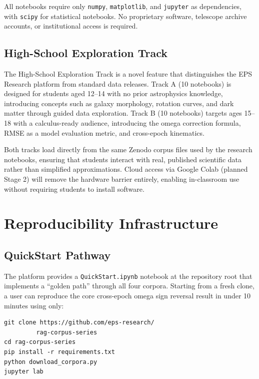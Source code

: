 \documentclass[twocolumn]{aastex631}
\begin{document}
All notebooks require only \texttt{numpy}, \texttt{matplotlib}, and
\texttt{jupyter} as dependencies, with \texttt{scipy} for statistical notebooks.
No proprietary software, telescope archive accounts, or institutional access
is required.

\subsection{High-School Exploration Track}
\label{sec:hs}

The High-School Exploration Track is a novel feature that distinguishes the
EPS Research platform from standard data releases. Track A (10 notebooks) is
designed for students aged 12--14 with no prior astrophysics knowledge,
introducing concepts such as galaxy morphology, rotation curves, and dark matter
through guided data exploration. Track B (10 notebooks) targets ages 15--18
with a calculus-ready audience, introducing the omega correction formula,
RMSE as a model evaluation metric, and cross-epoch kinematics.

Both tracks load directly from the same Zenodo corpus files used by the
research notebooks, ensuring that students interact with real, published
scientific data rather than simplified approximations. Cloud access via
Google Colab (planned Stage 2) will remove the hardware barrier entirely,
enabling in-classroom use without requiring students to install software.

\section{Reproducibility Infrastructure}
\label{sec:reproducibility}

\subsection{QuickStart Pathway}
\label{sec:quickstart}

The platform provides a \texttt{QuickStart.ipynb} notebook at the repository
root that implements a ``golden path'' through all four corpora. Starting from
a fresh clone, a user can reproduce the core cross-epoch omega sign reversal
result in under 10 minutes using only:

\begin{verbatim}
git clone https://github.com/eps-research/
         rag-corpus-series
cd rag-corpus-series
pip install -r requirements.txt
python download_corpora.py
jupyter lab
\end{verbatim}
\end{document}
